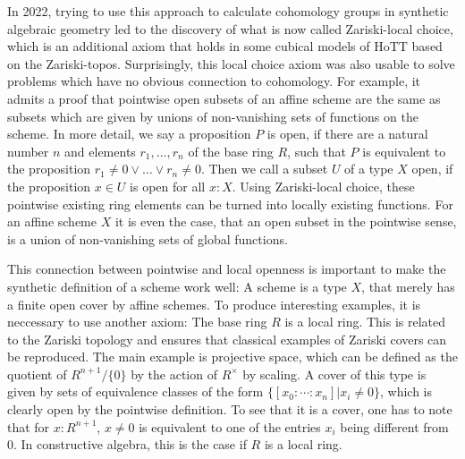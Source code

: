 In 2022, trying to use this approach to calculate cohomology groups in synthetic algebraic geometry led to the discovery of what is now called Zariski-local choice, which is an additional axiom that holds in some cubical models of HoTT based on the Zariski-topos. Surprisingly, this local choice axiom was also usable to solve problems which have no obvious connection to cohomology. For example, it admits a proof that pointwise open subsets of an affine scheme are the same as subsets which are given by unions of non-vanishing sets of functions on the scheme.
In more detail, we say a proposition $P$ is open, if there are a natural number $n$ and elements $r_1,\dots,r_n$ of the base ring $R$,
such that $P$ is equivalent to the proposition $r_1\neq 0 \vee\dots\vee r_n\neq 0$.
Then we call a subset $U$ of a type $X$ open, if the proposition $x\in U$ is open for all $x:X$.
Using Zariski-local choice, these pointwise existing ring elements can be turned into locally existing functions.
For an affine scheme $X$ it is even the case, that an open subset in the pointwise sense, is a union of non-vanishing sets of global functions.

This connection between pointwise and local openness is important to make the synthetic definition of a scheme work well:
A scheme is a type $X$, that merely has a finite open cover by affine schemes.
To produce interesting examples, it is neccessary to use another axiom: The base ring $R$ is a local ring.
This is related to the Zariski topology and ensures that classical examples of Zariski covers can be reproduced.
The main example is projective space, which can be defined as the quotient of $R^{n+1}/\{0\}$ by the action of $R^\times$ by scaling.
A cover of this type is given by sets of equivalence classes of the form $\{[x_0:\cdots:x_n] \vert x_i\neq 0 \}$, which is clearly open by the pointwise definition.
To see that it is a cover, one has to note that for $x:R^{n+1}$, $x\neq 0$ is equivalent to one of the entries $x_i$ being different from 0. In constructive algebra, this is the case if $R$ is a local ring.
